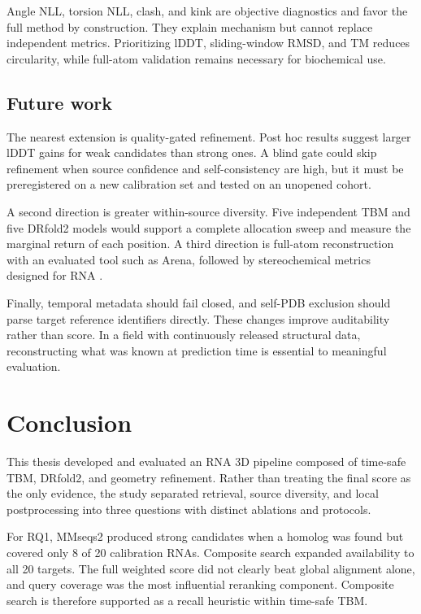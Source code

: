 \documentclass[12pt,a4paper,oneside]{report}
\begin{document}
Angle NLL, torsion NLL, clash, and kink are objective diagnostics and favor the full
method by construction. They explain mechanism but cannot replace independent metrics.
Prioritizing lDDT, sliding-window RMSD, and TM reduces circularity, while full-atom
validation remains necessary for biochemical use.

\section{Future work}

The nearest extension is quality-gated refinement. Post hoc results suggest larger lDDT
gains for weak candidates than strong ones. A blind gate could skip refinement when
source confidence and self-consistency are high, but it must be preregistered on a new
calibration set and tested on an unopened cohort.

A second direction is greater within-source diversity. Five independent TBM and five
DRfold2 models would support a complete allocation sweep and measure the marginal return
of each position. A third direction is full-atom reconstruction with an evaluated tool
such as Arena, followed by stereochemical metrics designed for RNA
\cite{arena,rna_puzzles_toolkit}.

Finally, temporal metadata should fail closed, and self-PDB exclusion should parse target
reference identifiers directly. These changes improve auditability rather than score. In
a field with continuously released structural data, reconstructing what was known at
prediction time is essential to meaningful evaluation.

\chapter{Conclusion}
\label{chap:conclusion_en}

This thesis developed and evaluated an RNA 3D pipeline composed of time-safe TBM,
DRfold2, and geometry refinement. Rather than treating the final score as the only
evidence, the study separated retrieval, source diversity, and local postprocessing into
three questions with distinct ablations and protocols.

For RQ1, MMseqs2 produced strong candidates when a homolog was found but covered only 8
of 20 calibration RNAs. Composite search expanded availability to all 20 targets. The
full weighted score did not clearly beat global alignment alone, and query coverage was
the most influential reranking component. Composite search is therefore supported as a
recall heuristic within time-safe TBM.
\end{document}
